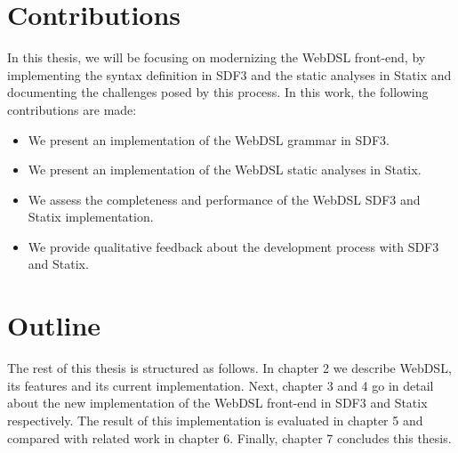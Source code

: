   \section{Contributions}
    In this thesis, we will be focusing on modernizing the WebDSL front-end, by implementing the syntax definition in SDF3 and the static analyses in Statix and documenting the challenges posed by this process. In this work, the following contributions are made:

    \begin{itemize}
      \item We present an implementation of the WebDSL grammar in SDF3.
      \item We present an implementation of the WebDSL static analyses in Statix.
      \item We assess the completeness and performance of the WebDSL SDF3 and Statix implementation.
      \item We provide qualitative feedback about the development process with SDF3 and Statix.
    \end{itemize}

  \section{Outline}
    The rest of this thesis is structured as follows. In chapter 2 we describe WebDSL, its features and its current implementation. Next, chapter 3 and 4 go in detail about the new implementation of the WebDSL front-end in SDF3 and Statix respectively. The result of this implementation is evaluated in chapter 5 and compared with related work in chapter 6. Finally, chapter 7 concludes this thesis.
